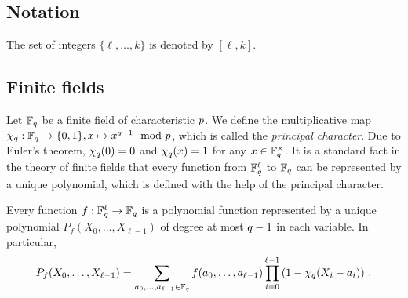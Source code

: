 \subsection{Notation}
	The set of integers $\{\ell,\dots,k\}$ is denoted by $[\ell,k]$.

\subsection{Finite fields}
	Let $\mathbb{F}_q$ be a finite field of characteristic $p$.
	We define the multiplicative map $\chi_q: \mathbb{F}_q \rightarrow \{0,1\}, x \mapsto x^{q-1} \mod {p}$, which is called the \emph{principal character}.
	Due to Euler's theorem, $\chi_q(0) = 0$ and $\chi_q(x) = 1$ for any $x \in \mathbb{F}_q^\times$.
	It is a standard fact in the theory of finite fields that every function from $\mathbb{F}_q^\ell$ to $\mathbb{F}_q$ can be represented by a unique polynomial, which is defined with the help of the principal character. 
	\begin{lemma}\label{lem:interpolation}
		Every function $f: \mathbb{F}_q^\ell \rightarrow \mathbb{F}_q$ is a polynomial function represented by a unique polynomial $P_f(X_0,\dots,X_{\ell-1})$ of degree at most $q-1$ in each variable.
		In particular,
		\begin{align*}
			P_f(X_0,\dots,X_{\ell-1}) = \sum_{a_0,\dots,a_{\ell-1} \in \mathbb{F}_q} f(a_0,\dots,a_{\ell-1}) \prod_{i=0}^{\ell-1} \left(1 - \chi_q(X_i - a_i)\right)\,.
		\end{align*}
	\end{lemma}
